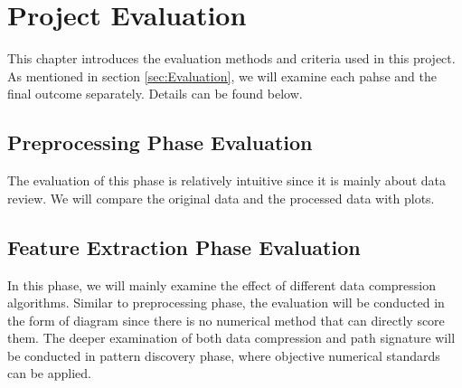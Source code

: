 \chapter{Project Evaluation}
\label{ch:evaluation}
This chapter introduces the evaluation methods and criteria used in this project.
As mentioned in section \ref{sec:Evaluation}, we will examine each pahse and the final outcome separately. Details can be found below.

\section{Preprocessing Phase Evaluation}
The evaluation of this phase is relatively intuitive since it is mainly about data review. We will compare the original data and the processed data with plots.

\section{Feature Extraction Phase Evaluation}
In this phase, we will mainly examine the effect of different data compression algorithms. Similar to preprocessing phase, the evaluation will be conducted in the form of diagram since there is no numerical method that can directly score them. The deeper examination of both data compression and path signature will be conducted in pattern discovery phase, where objective numerical standards can be applied.

